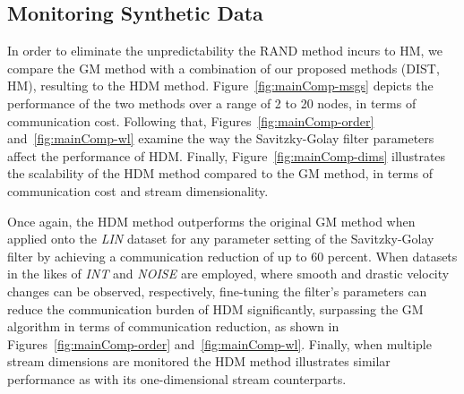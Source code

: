 \subsection{Monitoring Synthetic Data} \label{subsec:mainComp}

In order to eliminate the unpredictability the RAND method incurs to HM, we compare the GM method with a combination of our proposed methods (DIST, HM), resulting to the HDM method. Figure~\ref{fig:mainComp-msgs} depicts the performance of the two methods over a range of 2 to 20 nodes, in terms of communication cost. Following that, Figures~\ref{fig:mainComp-order} and~\ref{fig:mainComp-wl} examine the way the Savitzky-Golay filter parameters affect the performance of HDM. Finally, Figure~\ref{fig:mainComp-dims} illustrates the scalability of the HDM method compared to the GM method, in terms of communication cost and stream dimensionality.

Once again, the HDM method outperforms the original GM method when applied onto the \emph{LIN} dataset for any parameter setting of the Savitzky-Golay filter by achieving a communication reduction of up to 60 percent. When datasets in the likes of \emph{INT} and \emph{NOISE} are employed, where smooth and drastic velocity changes can be observed, respectively, fine-tuning the filter's parameters can reduce the communication burden of HDM significantly, surpassing the GM algorithm in terms of communication reduction, as shown in Figures~\ref{fig:mainComp-order} and~\ref{fig:mainComp-wl}. Finally, when multiple stream dimensions are monitored the HDM method illustrates similar performance as with its one-dimensional stream counterparts.

